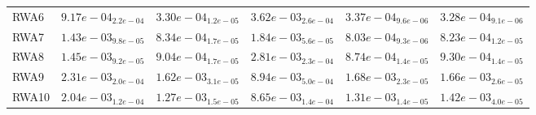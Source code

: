 \documentclass{article}
\begin{document}
\begin{table}
\begin{scriptsize}
\begin{tabular}{llllll}
RWA6 & $  9.17e-04_{ 2.2e-04}$ & \cellcolor{gray25}$  3.30e-04_{ 1.2e-05}$ & $  3.62e-03_{ 2.6e-04}$ & $  3.37e-04_{ 9.6e-06}$ & \cellcolor{gray95}$  3.28e-04_{ 9.1e-06}$ \\
RWA7 & $  1.43e-03_{ 9.8e-05}$ & $  8.34e-04_{ 1.7e-05}$ & $  1.84e-03_{ 5.6e-05}$ & \cellcolor{gray95}$  8.03e-04_{ 9.3e-06}$ & \cellcolor{gray25}$  8.23e-04_{ 1.2e-05}$ \\
RWA8 & $  1.45e-03_{ 9.2e-05}$ & \cellcolor{gray25}$  9.04e-04_{ 1.7e-05}$ & $  2.81e-03_{ 2.3e-04}$ & \cellcolor{gray95}$  8.74e-04_{ 1.4e-05}$ & $  9.30e-04_{ 1.4e-05}$ \\
RWA9 & $  2.31e-03_{ 2.0e-04}$ & \cellcolor{gray95}$  1.62e-03_{ 3.1e-05}$ & $  8.94e-03_{ 5.0e-04}$ & $  1.68e-03_{ 2.3e-05}$ & \cellcolor{gray25}$  1.66e-03_{ 2.6e-05}$ \\
RWA10 & $  2.04e-03_{ 1.2e-04}$ & \cellcolor{gray95}$  1.27e-03_{ 1.5e-05}$ & $  8.65e-03_{ 1.4e-04}$ & \cellcolor{gray25}$  1.31e-03_{ 1.4e-05}$ & $  1.42e-03_{ 4.0e-05}$ \\
\hline
\end{tabular}
\end{scriptsize}
\end{table}
\end{document}
